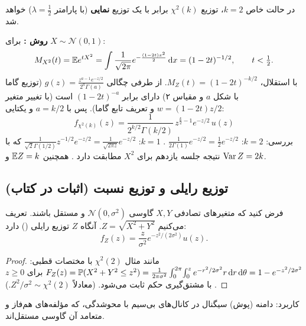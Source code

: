 \begin{note}
\notetitle در حالت خاص $k=2$، توزیع $\chi^2(k)$ برابر با یک توزیع \textbf{نمایی} (با پارامتر $\lambda=\frac12$) خواهد شد.
\end{note}

\begin{question}
\begin{answer}
\textbf{روش :} برای $X\sim\mathcal N(0,1)$:
\[
M_{X^2}(t)=\mathbb{E} e^{tX^2}=\int\frac{1}{\sqrt{2\pi}}e^{-\frac{(1-2t)x^2}{2}}\,\mathrm{d} x=(1-2t)^{-1/2},\qquad t<\tfrac12 .
\]
با استقلال، $M_Z(t)=(1-2t)^{-k/2}$. از طرفی چگالی $g(z)=\frac{z^{a-1}e^{-z/2}}{2^a\Gamma(a)}$ (توزیع گاما با شکل $a$ و مقیاس ۲) دارای  برابر $(1-2t)^{-a}$ است (با تغییر متغیر $w=(1-2t)z/2$ و تعریف تابع گاما). پس با $a=k/2$ و یکتایی:
\[
\boxed{\ f_{\chi^2(k)}(z)=\frac{1}{2^{k/2}\Gamma(k/2)}\,z^{\frac k2-1}e^{-z/2}\,u(z)\ }
\]
بررسی: $k=2$: $\frac{1}{2\Gamma(1)}e^{-z/2}=\frac12e^{-z/2}$ \checkmark. $k=1$: $\frac{1}{\sqrt2\Gamma(1/2)}z^{-1/2}e^{-z/2}=\frac{1}{\sqrt{2\pi z}}e^{-z/2}$ که با نتیجه جلسه یازدهم برای $X^2$ مطابقت دارد \checkmark. همچنین $\mathbb{E} Z=k$ و $\operatorname{Var} Z=2k$.
\end{answer}
\end{question}

\begin{center}
\end{center}

\subsection{توزیع رایلی و توزیع نسبت (اثبات در کتاب)}

\begin{theorem}[رایلی]
فرض کنید که متغیرهای تصادفی $X,Y$ گاوسی $\mathcal N(0,\sigma^2)$ و مستقل باشند. تعریف می‌کنیم $Z=\sqrt{X^2+Y^2}$. آنگاه $Z$ توزیع رایلی () دارد:
\[
f_Z(z)=\frac{z}{\sigma^2}e^{-z^2/(2\sigma^2)}u(z).
\]
\end{theorem}
\begin{proof}
مانند مثال $\chi^2(2)$ با مختصات قطبی:
$F_Z(z)=\mathbb{P}(X^2+Y^2\le z^2)=\frac{1}{2\pi\sigma^2}\int_0^{2\pi}\!\int_0^ze^{-r^2/2\sigma^2}r\,\mathrm{d} r\,\mathrm{d}\theta=1-e^{-z^2/2\sigma^2}$ برای $z\ge0$. با مشتق‌گیری حکم ثابت می‌شود. (معادلاً $Z^2/\sigma^2\sim\chi^2(2)$.)
\end{proof}
کاربرد: دامنه (پوش) سیگنال در کانال‌های بی‌سیم با محوشدگی، که مؤلفه‌های هم‌فاز و متعامد آن گاوسی مستقل‌اند.


